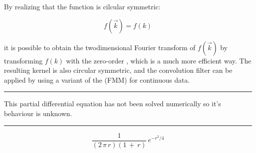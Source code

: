 By realizing that the function is cilcular symmetric:

\begin{equation} %
f(\vec{k}) = f(k)
\end{equation}

it is possible to obtain the twodimensional Fourier transform of $f(\vec{k})$ by transforming $f(k)$ with the zero-order , which is a much more efficient way. The resulting kernel is also circular symmetric, and the convolution filter can be applied by using a variant of the  (FMM) for continuous data.

\hrule{}

This partial differential equation has not been solved numerically so it's behaviour is unknown.

\hrule{}

\begin{equation}
\frac{1}{(2\,\pi\,r)(1\,+\,r)}\,e^{-r^2/4}
\end{equation}


